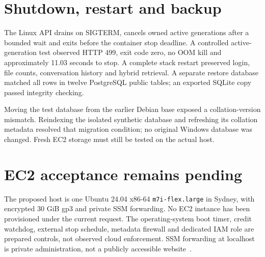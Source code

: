 \section{Shutdown, restart and backup}
The Linux API drains on SIGTERM, cancels owned active generations after a bounded wait and exits before the container stop deadline. A controlled active-generation test observed HTTP 499, exit code zero, no OOM kill and approximately 11.03 seconds to stop. A complete stack restart preserved login, file counts, conversation history and hybrid retrieval. A separate restore database matched all rows in twelve PostgreSQL public tables; an exported SQLite copy passed integrity checking.

Moving the test database from the earlier Debian base exposed a collation-version mismatch. Reindexing the isolated synthetic database and refreshing its collation metadata resolved that migration condition; no original Windows database was changed. Fresh EC2 storage must still be tested on the actual host.
\section{EC2 acceptance remains pending}
The proposed host is one Ubuntu 24.04 x86-64 \texttt{m7i-flex.large} in Sydney, with encrypted 30 GiB gp3 and private SSM forwarding. No EC2 instance has been provisioned under the current request. The operating-system boot timer, credit watchdog, external stop schedule, metadata firewall and dedicated IAM role are prepared controls, not observed cloud enforcement. SSM forwarding at localhost is private administration, not a publicly accessible website~\cite{ec2,ssmsession,docker}.
\FloatBarrier
